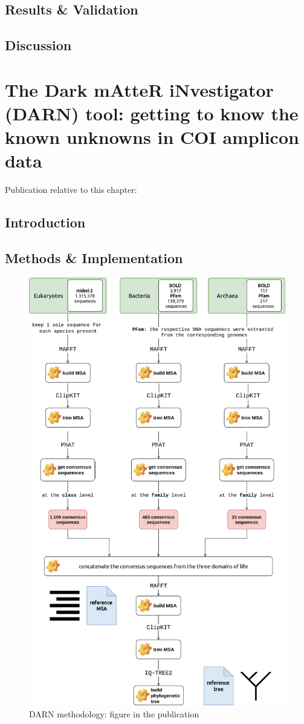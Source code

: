 \subsection{Results \& Validation}

\subsection{Discussion}


\section{The Dark mAtteR iNvestigator (DARN) tool: getting to know the known unknowns in COI amplicon data}

Publication relative to this chapter: \citep{zafeiropoulos2021dark}

\subsection{Introduction}

\subsection{Methods \& Implementation}

\begin{figure}[!htbp]
   \centering
   \includegraphics[width=0.75\columnwidth]{figures/darn_methodology.jpg}
   \caption{DARN methodology: figure in the publication}
\end{figure}



